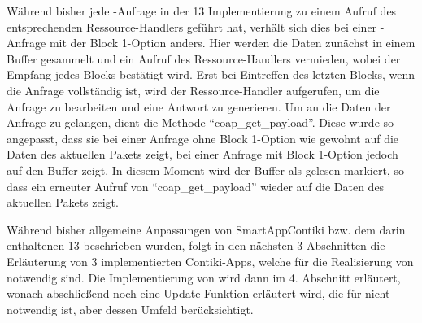 Während bisher jede -Anfrage in der  13 Implementierung zu einem Aufruf des entsprechenden Ressource-Handlers geführt hat, verhält sich
dies bei einer -Anfrage mit der Block 1-Option anders. Hier werden die Daten zunächst in einem Buffer gesammelt und ein Aufruf des Ressource-Handlers
vermieden, wobei der Empfang jedes Blocks bestätigt wird. Erst bei Eintreffen des letzten Blocks, wenn die Anfrage vollständig ist, wird der Ressource-Handler
aufgerufen, um die Anfrage zu bearbeiten und eine Antwort zu generieren. Um an die Daten der Anfrage zu gelangen, dient die Methode "`coap\_get\_payload"'.
Diese wurde so angepasst, dass sie bei einer Anfrage ohne Block 1-Option wie gewohnt auf die Daten des aktuellen Pakets zeigt, bei einer Anfrage mit Block 1-Option
jedoch auf den Buffer zeigt. In diesem Moment wird der Buffer als gelesen markiert, so dass ein erneuter Aufruf von "`coap\_get\_payload"' wieder auf die Daten
des aktuellen Pakets zeigt.

Während bisher allgemeine Anpassungen von SmartAppContiki bzw. dem darin enthaltenen  13 beschrieben wurden, folgt in den nächsten 3 Abschnitten
die Erläuterung von 3 implementierten Contiki-Apps, welche für die Realisierung von  notwendig sind. Die Implementierung von  wird dann
im 4. Abschnitt erläutert, wonach abschließend noch eine Update-Funktion erläutert wird, die für  nicht notwendig ist, aber dessen Umfeld berücksichtigt.






